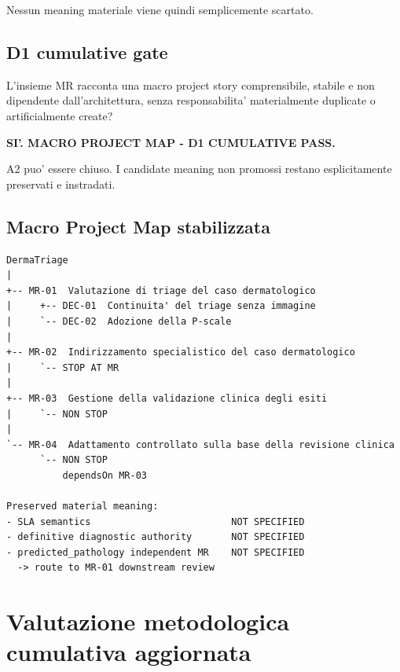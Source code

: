 \documentclass[11pt,a4paper]{article}
\begin{document}
Nessun meaning materiale viene quindi semplicemente scartato.

\subsection{D1 cumulative gate}

\begin{ddtacheck}[title={Domanda cumulativa}]
L'insieme MR racconta una macro project story comprensibile, stabile e non dipendente dall'architettura, senza responsabilita' materialmente duplicate o artificialmente create?
\end{ddtacheck}

\begin{ddtacore}[title={Macro Project Map disposition}]
\textbf{SI'. MACRO PROJECT MAP - D1 CUMULATIVE PASS.}

A2 puo' essere chiuso. I candidate meaning non promossi restano esplicitamente preservati e instradati.
\end{ddtacore}

\subsection{Macro Project Map stabilizzata}

\begin{ddtacore}[title={State after cumulative D1 closure}]
\begin{lstlisting}
DermaTriage
|
+-- MR-01  Valutazione di triage del caso dermatologico
|     +-- DEC-01  Continuita' del triage senza immagine
|     `-- DEC-02  Adozione della P-scale
|
+-- MR-02  Indirizzamento specialistico del caso dermatologico
|     `-- STOP AT MR
|
+-- MR-03  Gestione della validazione clinica degli esiti
|     `-- NON STOP
|
`-- MR-04  Adattamento controllato sulla base della revisione clinica
      `-- NON STOP
          dependsOn MR-03

Preserved material meaning:
- SLA semantics                         NOT SPECIFIED
- definitive diagnostic authority       NOT SPECIFIED
- predicted_pathology independent MR    NOT SPECIFIED
  -> route to MR-01 downstream review
\end{lstlisting}
\end{ddtacore}

\section{Valutazione metodologica cumulativa aggiornata}
\end{document}
